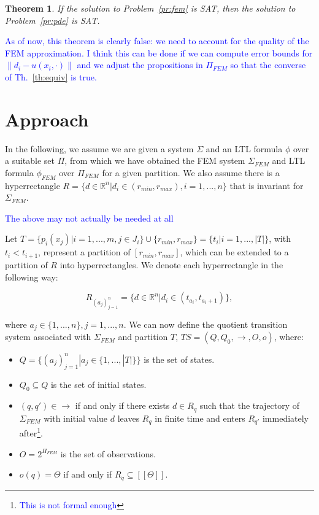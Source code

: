 \documentclass{article}
\newtheorem{theorem}{Theorem}
\newcommand*{\R}{\mathbb{R}}
\newcommand*{\fran}[1]{\textcolor{blue}{#1}}
\begin{document}
\begin{theorem}
    If the solution to Problem~\ref{pr:fem} is SAT, then the solution to
    Problem~\ref{pr:pde} is SAT.
\end{theorem}

\fran{As of now, this theorem is clearly false: we need to account for the
quality of the FEM approximation. I think this can be done if 
we can compute error bounds for $\|d_i - u(x_i, \cdot)\|$ and we adjust the
propositions in $\Pi_{FEM}$ so that the converse of Th.~\ref{th:equiv} is true.}

\section{Approach}

In the following, we assume we are given a system $\Sigma$ and an LTL formula
$\phi$ over a suitable set $\Pi$, from which we have obtained the 
FEM system $\Sigma_{FEM}$ and LTL formula $\phi_{FEM}$ over $\Pi_{FEM}$ for a
given partition. We also assume there is a hyperrectangle $R = \{d \in \R^n |
d_i \in (r_{min}, r_{max}), i = 1,...,n\}$ that is invariant for $\Sigma_{FEM}$.

\fran{The above may not actually be needed at all}

Let $T = \{ p_i(x_j) | i = 1,...,m, j \in J_i \} \cup \{r_{min}, r_{max}\} =
\{t_i | i = 1,..., |T|\}$, with $t_i < t_{i+1}$, represent a partition of $[r_{min},
r_{max}]$, which can be extended to a partition of $R$ into hyperrectangles. We
denote each hyperrectangle in the following way:

\begin{equation}
    R_{(a_j)_{j=1}^n} = \{d \in \R^n | d_i \in (t_{a_i}, t_{a_i + 1})\},
\end{equation}

where $a_j \in \{1,...,n\}, j=1,...,n$. We can now define the quotient
transition system associated with $\Sigma_{FEM}$ and partition $T$,
$TS = (Q, Q_0, \rightarrow, O, o)$, where:

\begin{itemize}
    \item $Q = \{(a_j)_{j=1}^n | a_j \in \{1,...,|T|\}\}$ is the set of states.
    \item $Q_0 \subseteq Q$ is the set of initial states.
    \item $(q,q') \in \rightarrow$ if and only if there exists $d \in R_q$ such
        that the trajectory of $\Sigma_{FEM}$ with initial value $d$ leaves
        $R_q$ in finite time and enters $R_{q'}$ immediately
        after\footnote{\fran{This is not formal enough}}.
    \item $O = 2^{\Pi_{FEM}}$ is the set of observations.
    \item $o(q) = \Theta$ if and only if $R_q \subseteq [[\Theta]]$.
\end{itemize}
\end{document}
